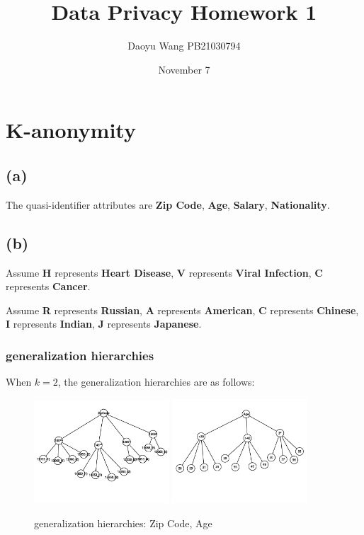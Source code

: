 \documentclass[a4paper,12pt]{article}
\title{Data Privacy Homework 1}
\author{Daoyu Wang   PB21030794}
\date{November 7}
\begin{document}
\maketitle
{}
\tableofcontents
\newpage

\section{K-anonymity}

\subsection{(a)}
The quasi-identifier attributes are \textbf{Zip Code}, \textbf{Age}, \textbf{Salary}, \textbf{Nationality}.

\subsection{(b)}
Assume \textbf{H} represents \textbf{Heart Disease}, \textbf{V} represents \textbf{Viral Infection}, \textbf{C} represents \textbf{Cancer}.

Assume \textbf{R} represents \textbf{Russian}, \textbf{A} represents \textbf{American}, \textbf{C} represents \textbf{Chinese}, \textbf{I} represents \textbf{Indian}, \textbf{J} represents \textbf{Japanese}.

\subsubsection{generalization hierarchies}
When $k = 2$, the generalization hierarchies are as follows:

\begin{figure}[ht]
    \centering
    \includegraphics[width=0.45\textwidth]{assets/3.png}
    \hfill
    \includegraphics[width=0.45\textwidth]{assets/4.png}
    \caption{generalization hierarchies: Zip Code, Age}
\end{figure}
\end{document}
